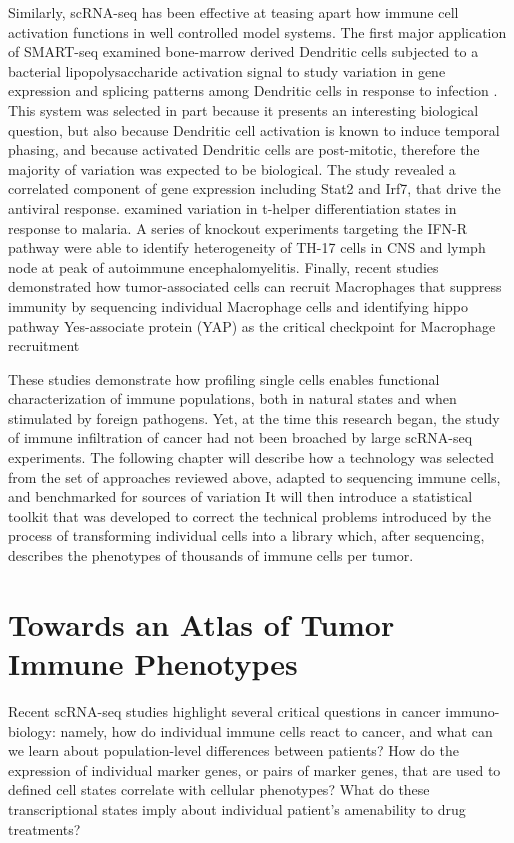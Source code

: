 Similarly, scRNA-seq has been effective at teasing apart how immune cell activation functions in well controlled model systems. 
The first major application of SMART-seq examined bone-marrow derived Dendritic cells subjected to a bacterial lipopolysaccharide activation signal to study variation in gene expression and splicing patterns among Dendritic cells in response to infection \citep{Shalek2013}.
This system was selected in part because it presents an interesting biological question, but also because Dendritic cell activation is known to induce temporal phasing, and because activated Dendritic cells are post-mitotic, therefore the majority of variation was expected to be biological. 
The study revealed a correlated component of gene expression including Stat2 and Irf7, that drive the antiviral response.
\cite{Loennberg2017} examined variation in t-helper differentiation states in response to malaria. 
A series of knockout experiments targeting the IFN-R pathway \citep{Gaublomme2015} were able to identify heterogeneity of TH-17 cells in CNS and lymph node at peak of autoimmune encephalomyelitis. 
Finally, recent studies demonstrated how tumor-associated cells can recruit Macrophages that suppress immunity by sequencing individual Macrophage cells and identifying hippo pathway Yes-associate protein (YAP) as the critical checkpoint for Macrophage recruitment \citep{Guo2017}

These studies demonstrate how profiling single cells enables functional characterization of immune populations, both in natural states and when stimulated by foreign pathogens. 
Yet, at the time this research began, the study of immune infiltration of cancer had not been broached by large scRNA-seq experiments. 
The following chapter will describe how a technology was selected from the set of approaches reviewed above, adapted to sequencing immune cells, and benchmarked for sources of variation
It will then introduce a statistical toolkit that was developed to correct the technical problems introduced by the process of transforming individual cells into a library which, after sequencing, describes the phenotypes of thousands of immune cells per tumor. 

\section{Towards an Atlas of Tumor Immune Phenotypes}

Recent scRNA-seq studies highlight several critical questions in cancer immuno-biology: namely, how do individual immune cells react to cancer, and what can we learn about population-level differences between patients? 
How do the expression of individual marker genes, or pairs of marker genes, that are used to defined cell states correlate with cellular phenotypes? 
What do these transcriptional states imply about individual patient's amenability to drug treatments?  


